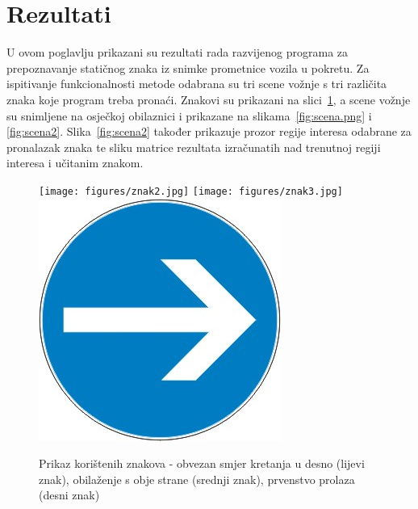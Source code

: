 \newpage
\setcounter{figure}{0}

\section{Rezultati} %
\label{sec:Rezultati}

U ovom poglavlju prikazani su rezultati rada razvijenog programa za
prepoznavanje statičnog znaka iz snimke prometnice vozila u pokretu.  Za ispitivanje funkcionalnosti metode odabrana su tri scene vožnje
s tri različita znaka koje program treba pronaći. Znakovi su 
prikazani na
slici~\ref{fig:znak}, a scene vožnje su snimljene na osječkoj
obilaznici i prikazane na slikama~\ref{fig:scena.png} i \ref{fig:scena2}. Slika~\ref{fig:scena2} također prikazuje prozor
regije interesa odabrane za pronalazak znaka te sliku matrice
rezultata izračunatih nad trenutnoj regiji interesa i učitanim znakom. 


\begin{figure}[!htb]
\endminipage\hfill
{}
    \texttt{[image: figures/znak2.jpg]}
\endminipage\hfill
{}
    \texttt{[image: figures/znak3.jpg]}
\endminipage\hfill
{}
    \includegraphics[width=\linewidth]{figures/znak.png}
\endminipage\hfill
{}
\endminipage\hfill
\caption{Prikaz korištenih znakova - obvezan smjer kretanja u desno (lijevi znak), 
obilaženje s obje strane (srednji znak), prvenstvo prolaza (desni znak)}
\label{fig:znak}
\end{figure}

